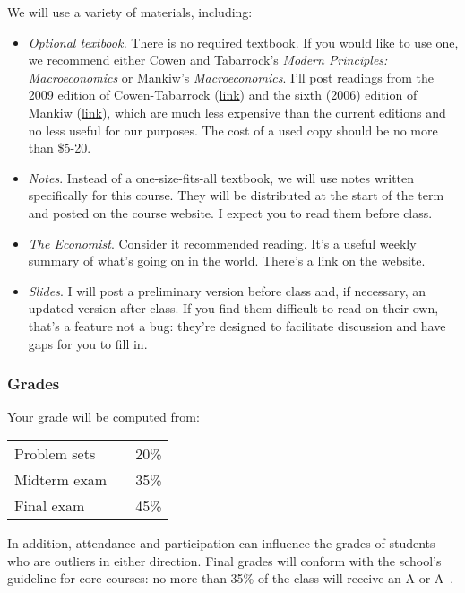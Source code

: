 \documentclass[12pt]{article}
\begin{document}
We will use a variety of materials, including:
%
\begin{itemize}

\item {\it Optional textbook.\/}
There is no required textbook.
If you would like to use one, we recommend either
Cowen and Tabarrock's {\it Modern Principles:  Macroeconomics\/}
or Mankiw's {\it Macroeconomics\/}.
I'll post readings from the 2009 edition of
Cowen-Tabarrock
(\href{http://www.amazon.com/Modern-Principles-Macroeconomics-Tyler-Cowen/dp/1429202491}{link})
and the sixth (2006) edition of Mankiw
(\href{http://www.amazon.com/Macroeconomics-N-Gregory-Mankiw/dp/0716767112/}{link}),
which are much less expensive than the current editions
and no less useful for our purposes.
The cost of a used copy should be no more than \$5-20.

\item {\it Notes\/}.
Instead of a one-size-fits-all textbook,
we will use notes written specifically for this course.
They will be distributed at the start of the term and
posted on the course website.
I expect you to read them before class.

\item {\it The Economist\/}.
Consider it recommended reading.
It's a useful weekly summary of what's going on in the world.
There's a link on the website.

\item {\it Slides\/}.
I will post a preliminary version before class
and, if necessary, an updated version after class.
If you find them difficult to read on their own,
that's a feature not a bug:
they're designed to facilitate discussion
and have gaps for you to fill in.
\end{itemize}


\subsubsection*{Grades}

Your grade will be computed from:
%
\begin{center}
\begin{tabular}{lcc}
    Problem sets   &&  20\% \\
    Midterm exam   &&  35\% \\
    Final exam     &&  45\%
\end{tabular}
\end{center}
%
In addition, attendance and participation can influence
the grades of students who are outliers in either direction.
Final grades will conform with the school's guideline for core courses:
no more than 35\% of the class will receive an A or A--.
\end{document}

